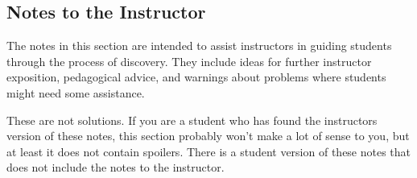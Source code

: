 \begin{annotation}
 \chapter{Notes to the Instructor}

 The notes in this section are intended to assist instructors in guiding students through the process of discovery. They include ideas for further instructor exposition, pedagogical advice, and warnings about problems where students might need some assistance.

 These are not solutions. If you are a student who has found the instructors version of these notes, this section probably won't make a lot of sense to you, but at least it does not contain spoilers. There is a student version of these notes that does not include the notes to the instructor.

 \renewcommand\notesname{}
 \vspace{-2cm}
 \begingroup
 \setlength{\parskip}{2ex}
 \def\enotesize{\large} %
 \theendnotes
 \endgroup
\end{annotation}

\vspace{.1in}


